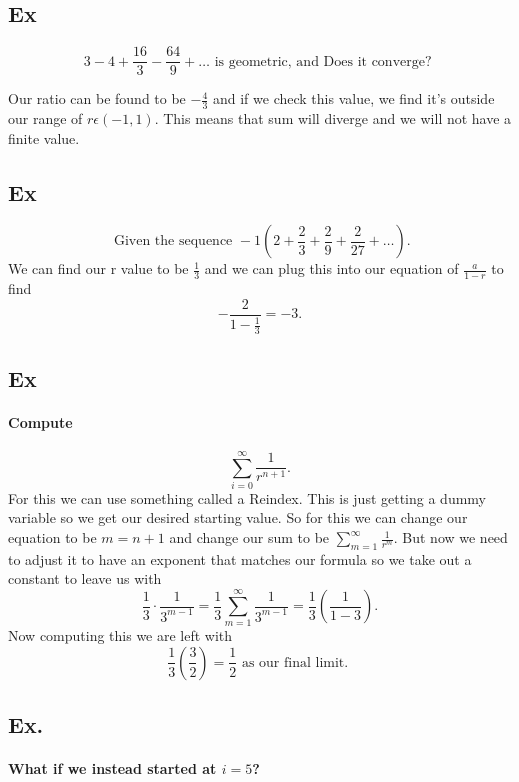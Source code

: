 \newpage
\subsection{Ex}%
\label{sub:Ex}
\[
3-4+\frac{ 16 }{ 3 } -\frac{ 64 }{ 9 } +\ldots \text{ is geometric, and Does it converge? }
\] 

Our ratio can be found to be $ -\frac{ 4 }{ 3 }  $ and if we check this value, we find it's outside our range of $ r\epsilon\left( -1,1 \right)  $. This means that sum will diverge and we will not have a finite value. 

\subsection{Ex}%
\label{sub:Ex}
\[
\text{ Given the sequence }-1\left( 2+\frac{ 2 }{ 3 } +\frac{ 2 }{ 9 } +\frac{ 2 }{ 27 } +\ldots \right) 
.\] 
We can find our r value to be $ \frac{ 1 }{ 3 }  $ and we can plug this into our equation of $ \frac{ a }{ 1-r } $ to find
\[
-\frac{ 2 }{ 1-\frac{ 1 }{ 3 }  } =-3
.\]

\subsection{Ex}%
\label{sub:Ex}
\paragraph{Compute}
\[
\sum_{ i=0 } ^{ \infty } \frac{ 1 }{ r^{ n+1 } }
.\] 
For this we can use something called a Reindex. This is just getting a dummy variable so we get our desired starting value. So for this we can change our equation to be $ m=n+1 $ and change our sum to be $ \sum_{ m=1 } ^{ \infty } \frac{ 1 }{ r^{ m } }  $. But now we need to adjust it to have an exponent that matches our formula so we take out a constant to leave us with
\[
\frac{ 1 }{ 3 } \cdot \frac{ 1 }{ 3^{ m-1 } } =\frac{ 1 }{ 3 } \sum_{ m=1 } ^{ \infty } \frac{ 1 }{ 3^{ m-1 } } =\frac{ 1 }{ 3 } \left( \frac{ 1 }{ 1-3 }  \right) 
.\] 
Now computing this we are left with
\[
\frac{ 1 }{ 3 } \left( \frac{ 3 }{ 2 }  \right) =\frac{ 1 }{ 2 } \text{ as our final limit. }
\] 

\subsection{Ex.}%
\label{sub:Ex.}
\paragraph{What if we instead started at $ i=5 $?}
